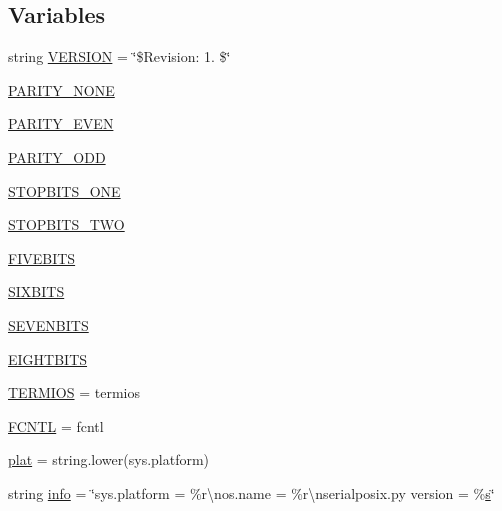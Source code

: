 \subsection*{Variables}
\begin{DoxyCompactItemize}
\item 
string \hyperlink{namespaceserial_1_1serialposix_ae5b92bdc83f9cab4a0f9541ea2e09fa5}{V\+E\+R\+S\+I\+ON} = \char`\"{}\$Revision\+: 1. \$\char`\"{}
\item 
\hyperlink{namespaceserial_1_1serialposix_aa5b7b60904211b474e9013237532ec87}{P\+A\+R\+I\+T\+Y\+\_\+\+N\+O\+NE}
\item 
\hyperlink{namespaceserial_1_1serialposix_a592654b61618195fda85a78121744765}{P\+A\+R\+I\+T\+Y\+\_\+\+E\+V\+EN}
\item 
\hyperlink{namespaceserial_1_1serialposix_a67b92a3ff04918b300f44bcffa25a684}{P\+A\+R\+I\+T\+Y\+\_\+\+O\+DD}
\item 
\hyperlink{namespaceserial_1_1serialposix_a5e4bbb80f58a3f018286e96819b644f3}{S\+T\+O\+P\+B\+I\+T\+S\+\_\+\+O\+NE}
\item 
\hyperlink{namespaceserial_1_1serialposix_a2df2804b6c5576b2043e6ca2a55e3f9f}{S\+T\+O\+P\+B\+I\+T\+S\+\_\+\+T\+WO}
\item 
\hyperlink{namespaceserial_1_1serialposix_ae35e9f19b0bcb55905ee62e57ebe2265}{F\+I\+V\+E\+B\+I\+TS}
\item 
\hyperlink{namespaceserial_1_1serialposix_a55e881fb29c15325b550f3d360e3de9a}{S\+I\+X\+B\+I\+TS}
\item 
\hyperlink{namespaceserial_1_1serialposix_a57c1890beed95c6676d08513807eee10}{S\+E\+V\+E\+N\+B\+I\+TS}
\item 
\hyperlink{namespaceserial_1_1serialposix_a13bbd9cdf28bc7e65e994437f952a586}{E\+I\+G\+H\+T\+B\+I\+TS}
\item 
\hyperlink{namespaceserial_1_1serialposix_ad56e7a51b0acdb47ce56707e4b7560b8}{T\+E\+R\+M\+I\+OS} = termios
\item 
\hyperlink{namespaceserial_1_1serialposix_a7392962531296ddfa3cf96d9844e5190}{F\+C\+N\+TL} = fcntl
\item 
\hyperlink{namespaceserial_1_1serialposix_aa4040a06e7e1b372ab5bcb9b9be9494b}{plat} = string.\+lower(sys.\+platform)
\item 
string \hyperlink{namespaceserial_1_1serialposix_a7fb418820b365d6dbde6236e6cf518f1}{info} = \char`\"{}sys.\+platform = \%r\textbackslash{}nos.\+name = \%r\textbackslash{}nserialposix.\+py version = \%\hyperlink{namespaceserial_1_1serialposix_af9c46eecd92c16ec0132591690404e3a}{s}\char`\"{}

\end{DoxyCompactItemize}
